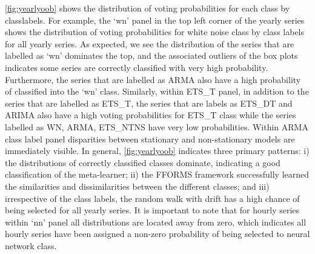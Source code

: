 \documentclass[11pt,a4paper,]{article}
\begin{document}
\autoref{fig:yearlyoob} shows the distribution of voting probabilities for each class by classlabels. For example, the `wn' panel in the top left corner of the yearly series shows the distribution of voting probabilities for white noise class by class labels for all yearly series. As expected, we see the distribution of the series that are labelled as `wn' dominates the top, and the associated outliers of the box plots indicates some series are correctly classified with very high probability. Furthermore, the series that are labelled as ARMA also have a high probability of classified into the `wn' class. Similarly, within ETS\_T panel, in addition to the series that are labelled as ETS\_T, the series that are labels as ETS\_DT and ARIMA also have a high voting probabilities for ETS\_T class while the series labelled as WN, ARMA, ETS\_NTNS have very low probabilities. Within ARMA class label panel disparities between stationary and non-stationary models are immediately visible. In general, \autoref{fig:yearlyoob} indicates three primary patterns: i) the distributions of correctly classified classes dominate, indicating a good classification of the meta-learner; ii) the FFORMS framework successfully learned the similarities and dissimilarities between the different classes; and iii) irrespective of the class labels, the random walk with drift has a high chance of being selected for all yearly series. It is important to note that for hourly series within `nn' panel all distributions are located away from zero, which indicates all hourly series have been assigned a non-zero probability of being selected to neural network class.
\end{document}
